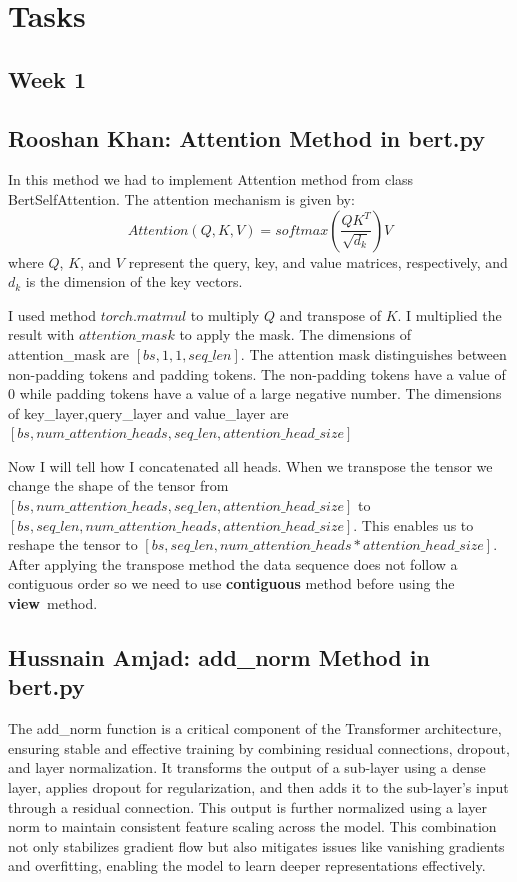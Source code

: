\documentclass{article}
\begin{document}
\section{Tasks}
\subsection{Week 1}
\subsection{Rooshan Khan: Attention Method in bert.py}
In this method we had to implement Attention method from class BertSelfAttention. The attention mechanism is given by:
\begin{equation} \label{eqn}
Attention(Q,K,V) = {softmax(\frac{QK^T}{\sqrt{d_k}})V}
\end{equation}
where \( Q \), \( K \), and \( V \) represent the query, key, and value matrices, respectively, and \( d_k \) is the dimension of the key vectors.

I used method \( torch.matmul \) to multiply \( Q \) and transpose of \( K \). I multiplied the result with \( attention\_mask \) to apply the mask. The dimensions of attention\_mask are \( [bs, 1, 1, seq\_len] \). The attention mask distinguishes between non-padding tokens and padding tokens. The non-padding tokens have a value of 0 while padding tokens have a value of a large negative number. The dimensions of key\_layer,query\_layer and value\_layer are \( [bs, num\_attention\_heads, seq\_len, attention\_head\_size] \)

Now I will tell how I concatenated all heads. When we transpose the tensor we change the shape of the tensor from \( [bs,num\_attention\_heads,seq\_len,attention\_head\_size] \) to \( [bs,seq\_len,num\_attention\_heads,attention\_head\_size] \). This enables us to reshape the tensor to \( [bs,seq\_len,num\_attention\_heads*attention\_head\_size] \). After applying the transpose method the data sequence does not follow a contiguous order so we need to use \textbf{contiguous} method before using the \textbf{view}\ method.

\subsection{Hussnain Amjad: add\_norm Method in bert.py}
The add\_norm function is a critical component of the Transformer architecture, ensuring stable and effective training by combining residual connections, dropout, and layer normalization. It transforms the output of a sub-layer using a dense layer, applies dropout for regularization, and then adds it to the sub-layer's input through a residual connection. This output is further normalized using a layer norm to maintain consistent feature scaling across the model. This combination not only stabilizes gradient flow but also mitigates issues like vanishing gradients and overfitting, enabling the model to learn deeper representations effectively.
\end{document}
